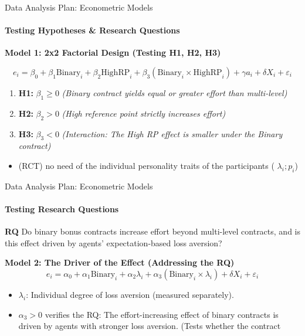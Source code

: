\documentclass{beamer}
\begin{document}
\begin{frame}{Data Analysis Plan: Econometric Models}
\framesubtitle{Testing Hypotheses \& Research Questions}

    \textbf{Model 1: 2x2 Factorial Design (Testing H1, H2, H3)}
    
    \vspace{-0.15cm}
    
    $$e_i = \beta_0 + \beta_1 \text{Binary}_i + \beta_2 \text{HighRP}_i + \beta_3 (\text{Binary}_i \times \text{HighRP}_i) + \gamma a_i + \delta X_i + \varepsilon_i$$
   
    \begin{enumerate}
        \item \textbf{H1:} $\beta_1 \geq 0$ \textit{(Binary contract yields equal or greater effort than multi-level)}
        \item \textbf{H2:} $\beta_2 > 0$ \textit{(High reference point strictly increases effort)}
        \item \textbf{H3:} $\beta_3 < 0$ \textit{(Interaction: The High RP effect is smaller under the Binary contract)}
    \end{enumerate}

    \begin{itemize}
        \item (RCT) no need of the individual personality traits of the participants ( $\lambda_i; p_i$)
    \end{itemize}

\end{frame}

\begin{frame}{Data Analysis Plan: Econometric Models}
\framesubtitle{Testing Research Questions}

    \textbf{RQ} Do binary bonus contracts increase effort beyond multi-level contracts, and is this effect driven by agents' expectation-based loss aversion?

    \textbf{Model 2: The Driver of the Effect (Addressing the RQ)}
    \vspace{-0.1cm}
    $$e_i = \alpha_0 + \alpha_1 \text{Binary}_i + \alpha_2 \lambda_i + \alpha_3 (\text{Binary}_i \times \lambda_i) + \delta X_i + \varepsilon_i$$
    \begin{itemize}
        \item $\lambda_i$: Individual degree of loss aversion (measured separately).
        \item $\alpha_3 > 0$ verifies the RQ: The effort-increasing effect of binary contracts is driven by agents with stronger loss aversion. (Tests whether the contract 
    \end{itemize}
    
\end{frame}
\end{document}
